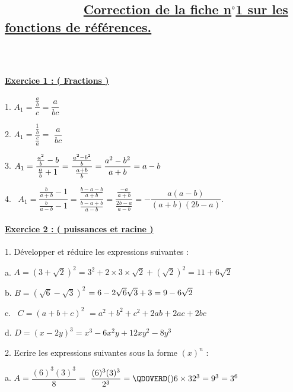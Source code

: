 \documentclass{article}
\begin{document}
\subsection{ \ \ \ \ \ \ \ \ \ \ \ \protect\underline{Correction de la fiche
n$%
{{}^\circ}%
$1 sur les fonctions de r\'{e}f\'{e}rences.}}

\subsubsection{\ \ \ \ \ \ \ \ }

\paragraph{\protect\underline{Exercice 1 : ( Fractions )}}

1. $A_{1}=\dfrac{\frac{a}{b}}{c}=\dfrac{a}{bc}$ \ \ 

2. $A_{1}=\dfrac{\frac{1}{b}}{\frac{c}{a}}=$ $\dfrac{a}{bc}$\ \ \ \ \ \ \ \
\ \ \ \ \ \ \ \ \ \ \ 

3. $A_{1}=\dfrac{\frac{a^{2}}{b}-b}{\frac{a}{b}+1}=\dfrac{\frac{a^{2}-b^{2}}{%
b}}{\frac{a+b}{b}}=\dfrac{a^{2}-b^{2}}{a+b}=a-b$\ \ \ \ \ \ \ \ \ \ \ \ \ \
\ \ 

4. \ $A_{1}=\dfrac{\frac{b}{a+b}-1}{\frac{b}{a-b}-1}=\dfrac{\frac{b-a-b}{a+b}%
}{\frac{b-a+b}{a-b}}=\dfrac{\frac{-a}{a+b}}{\frac{2b-a}{a-b}}=-\dfrac{a(a-b)%
}{(a+b)(2b-a)}.$

\paragraph{\protect\underline{Exercice 2 : ( puissances et racine )}}

1. D\'{e}velopper et r\'{e}duire les expressions suivantes :

a. $A=(3+\sqrt{2})^{2}=3^{2}+2\times 3\times \sqrt{2}+\left( \sqrt{2}\right)
^{2}=11+6\sqrt{2}$

b. $B=\left( \sqrt{6}-\sqrt{3}\right) ^{2}$ $=6-2\sqrt{6}\sqrt{3}+3=9-6\sqrt{%
2}$

c. \ $C=\left( a+b+c\right) ^{2}$ $=a^{2}+b^{2}+c^{2}+2ab+2ac+2bc$\ \ 

d. $D=\left( x-2y\right) ^{3}=x^{3}-6x^{2}y+12xy^{2}-8y^{3}$

2. Ecrire les expressions suivantes sous la forme $(x)^{n}$ :

a. $A=\dfrac{(6)^{3}(3)^{3}}{8}=$ $\dfrac{(6)^{3}(3)^{3}}{2^{3}}=\QDOVERD( )
{6\times 3}{2}^{3}=9^{3}=3^{6}$\ \ 
\end{document}
